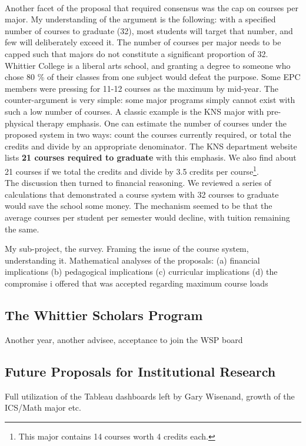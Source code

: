 \documentclass[../../../main.tex]{subfiles}
\begin{document}
\\
\vspace{0.25cm}
Another facet of the proposal that required consensus was the cap on courses per major.  My understanding of the argument is the following: with a specified number of courses to graduate (32), most students will target that number, and few will deliberately exceed it.  The number of courses per major needs to be capped such that majors do not constitute a significant proportion of 32.  Whittier College is a liberal arts school, and granting a degree to someone who chose 80 \% of their classes from one subject would defeat the purpose.  Some EPC members were pressing for 11-12 courses as the maximum by mid-year.  The counter-argument is very simple: some major programs simply cannot exist with such a low number of courses.  A classic example is the KNS major with pre-physical therapy emphasis.  One can estimate the number of courses under the proposed system in two ways: count the courses currently required, or total the credits and divide by an appropriate denominator.  The KNS department website lists \textbf{21 courses required to graduate} with this emphasis.  We also find about 21 courses if we total the credits and divide by 3.5 credits per course\footnote{This major contains 14 courses worth 4 credits each.}.  
\\
\vspace{0.25cm}
The discussion then turned to financial reasoning.  We reviewed a series of calculations that demonstrated a course system with 32 courses to graduate would save the school some money.  The mechanism seemed to be that the average courses per student per semester would decline, with tuition remaining the same.

My sub-project, the survey.  Framing the issue of the course system, understanding it.  Mathematical analyses of the proposals: (a) financial implications (b) pedagogical implications (c) curricular implications (d) the compromise i offered that was accepted regarding maximum course loads

\subsection{The Whittier Scholars Program}

Another year, another advisee, acceptance to join the WSP board

\subsection{Future Proposals for Institutional Research}

Full utilization of the Tableau dashboards left by Gary Wisenand, growth of the ICS/Math major etc.
\end{document}

